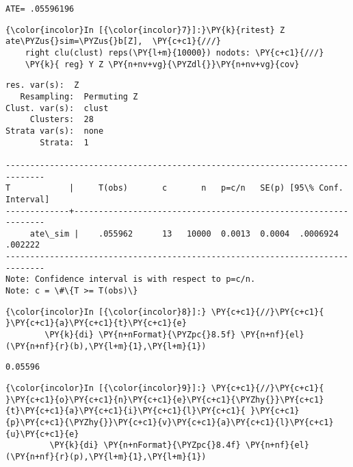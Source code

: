 \documentclass[11pt,notitlepage]{article}\usepackage[]{graphicx}\usepackage[]{color}
\makeatletter
\newenvironment{kframe}{%
 \def\at@end@of@kframe{}%
 \ifinner\ifhmode%
  \def\at@end@of@kframe{\end{minipage}}%
  \begin{minipage}{\columnwidth}%
 \fi\fi%
 \def\FrameCommand##1{\hskip\@totalleftmargin \hskip-\fboxsep
 \colorbox{shadecolor}{##1}\hskip-\fboxsep
     \hskip-\linewidth \hskip-\@totalleftmargin \hskip\columnwidth}%
 \MakeFramed {\advance\hsize-\width
   \@totalleftmargin\z@ \linewidth\hsize
   \@setminipage}}%
 {\par\unskip\endMakeFramed%
 \at@end@of@kframe}
\newenvironment{knitrout}{}{} %
\makeatother
\begin{document}
\begin{enumerate}[a)]
\begin{knitrout}
\begin{kframe}
    \begin{Verbatim}[commandchars=\\\{\}]
ATE= .05596196
    \end{Verbatim}

    \begin{Verbatim}[commandchars=\\\{\}]
{\color{incolor}In [{\color{incolor}7}]:}\PY{k}{ritest} Z ate\PYZus{}sim=\PYZus{}b[Z],  \PY{c+c1}{///}
	right clu(clust) reps(\PY{l+m}{10000}) nodots: \PY{c+c1}{///}
	\PY{k}{ reg} Y Z \PY{n+nv+vg}{\PYZdl{}}\PY{n+nv+vg}{cov}
\end{Verbatim}

    \begin{Verbatim}[commandchars=\\\{\}]
  res. var(s):  Z
   Resampling:  Permuting Z
Clust. var(s):  clust
     Clusters:  28
Strata var(s):  none
       Strata:  1

------------------------------------------------------------------------------
T            |     T(obs)       c       n   p=c/n   SE(p) [95\% Conf. Interval]
-------------+----------------------------------------------------------------
     ate\_sim |    .055962      13   10000  0.0013  0.0004  .0006924    .002222
------------------------------------------------------------------------------
Note: Confidence interval is with respect to p=c/n.
Note: c = \#\{T >= T(obs)\}

    \end{Verbatim}

    \begin{Verbatim}[commandchars=\\\{\}]
{\color{incolor}In [{\color{incolor}8}]:} \PY{c+c1}{//}\PY{c+c1}{ }\PY{c+c1}{a}\PY{c+c1}{t}\PY{c+c1}{e}
        \PY{k}{di} \PY{n+nFormat}{\PYZpc{}8.5f} \PY{n+nf}{el}(\PY{n+nf}{r}(b),\PY{l+m}{1},\PY{l+m}{1})
\end{Verbatim}

    \begin{Verbatim}[commandchars=\\\{\}]
 0.05596
    \end{Verbatim}

    \begin{Verbatim}[commandchars=\\\{\}]
{\color{incolor}In [{\color{incolor}9}]:} \PY{c+c1}{//}\PY{c+c1}{ }\PY{c+c1}{o}\PY{c+c1}{n}\PY{c+c1}{e}\PY{c+c1}{\PYZhy{}}\PY{c+c1}{t}\PY{c+c1}{a}\PY{c+c1}{i}\PY{c+c1}{l}\PY{c+c1}{ }\PY{c+c1}{p}\PY{c+c1}{\PYZhy{}}\PY{c+c1}{v}\PY{c+c1}{a}\PY{c+c1}{l}\PY{c+c1}{u}\PY{c+c1}{e}
         \PY{k}{di} \PY{n+nFormat}{\PYZpc{}8.4f} \PY{n+nf}{el}(\PY{n+nf}{r}(p),\PY{l+m}{1},\PY{l+m}{1})
\end{Verbatim}


\end{kframe}
\end{knitrout}
\end{enumerate}
\end{document}
